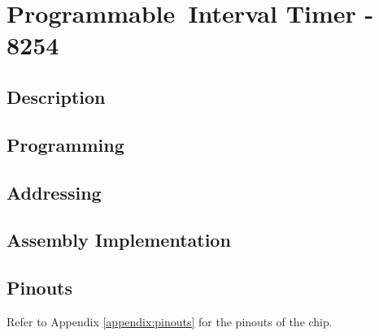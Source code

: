 \newpage
\section{Programmable Interval Timer - 8254}

    \subsection{Description}

    \subsection{Programming}

    \subsection{Addressing}

    \subsection{Assembly Implementation}

    \subsection{Pinouts}
    Refer to Appendix \ref{appendix:pinouts} for the pinouts of the chip.
